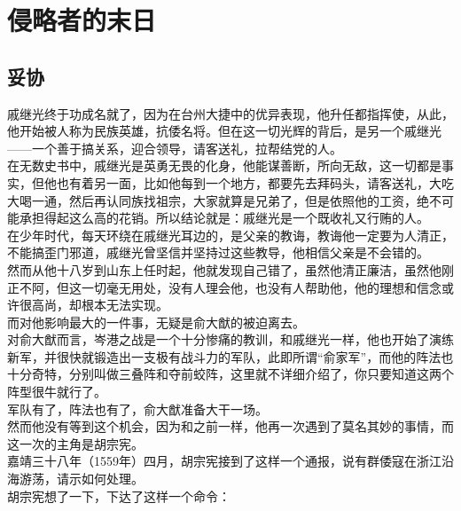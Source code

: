 \section{侵略者的末日}
\ifnum{}
	\begin{multicols}{\theparacolNo}
\fi
\subsection{妥协}
戚继光终于功成名就了，因为在台州大捷中的优异表现，他升任都指挥使，从此，他开始被人称为民族英雄，抗倭名将。但在这一切光辉的背后，是另一个戚继光——一个善于搞关系，迎合领导，请客送礼，拉帮结党的人。\\

在无数史书中，戚继光是英勇无畏的化身，他能谋善断，所向无敌，这一切都是事实，但他也有着另一面，比如他每到一个地方，都要先去拜码头，请客送礼，大吃大喝一通，然后再认同族找祖宗，大家就算是兄弟了，但是依照他的工资，绝不可能承担得起这么高的花销。所以结论就是：戚继光是一个既收礼又行贿的人。\\

在少年时代，每天环绕在戚继光耳边的，是父亲的教诲，教诲他一定要为人清正，不能搞歪门邪道，戚继光曾坚信并坚持过这些教导，他相信父亲是不会错的。\\

然而从他十八岁到山东上任时起，他就发现自己错了，虽然他清正廉洁，虽然他刚正不阿，但这一切毫无用处，没有人理会他，也没有人帮助他，他的理想和信念或许很高尚，却根本无法实现。\\

而对他影响最大的一件事，无疑是俞大猷的被迫离去。\\

对俞大猷而言，岑港之战是一个十分惨痛的教训，和戚继光一样，他也开始了演练新军，并很快就锻造出一支极有战斗力的军队，此即所谓“俞家军”，而他的阵法也十分奇特，分别叫做三叠阵和夺前蛟阵，这里就不详细介绍了，你只要知道这两个阵型很牛就行了。\\

军队有了，阵法也有了，俞大猷准备大干一场。\\

然而他没有等到这个机会，因为和之前一样，他再一次遇到了莫名其妙的事情，而这一次的主角是胡宗宪。\\

嘉靖三十八年（1559年）四月，胡宗宪接到了这样一个通报，说有群倭寇在浙江沿海游荡，请示如何处理。\\

胡宗宪想了一下，下达了这样一个命令：\\


\end{multicols}
